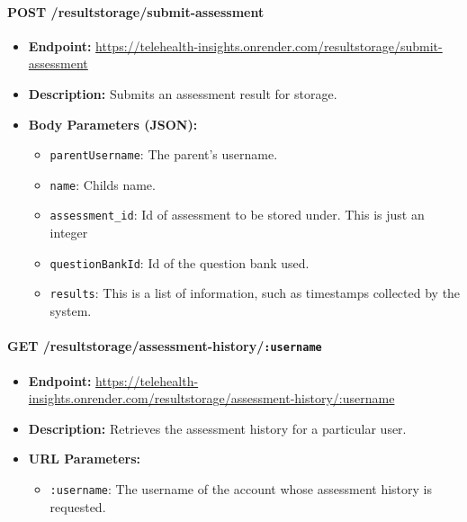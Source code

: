 \documentclass{article}
\begin{document}
  \paragraph{POST /resultstorage/submit-assessment}
  \begin{itemize}
      \item \textbf{Endpoint:} 
          \url{https://telehealth-insights.onrender.com/resultstorage/submit-assessment}
      \item \textbf{Description:} Submits an assessment result for storage.
      \item \textbf{Body Parameters (JSON):}
      \begin{itemize}
          \item \texttt{parentUsername}: The parent’s username.
          \item \texttt{name}: Childs name.
          \item \texttt{assessment\_id}: Id of assessment to be stored under. This is just an integer
          \item \texttt{questionBankId}: Id of the question bank used. 
          \item \texttt{results}: This is a list of information, such as timestamps collected by the system.
      \end{itemize}
  \end{itemize}
  
  \paragraph{GET /resultstorage/assessment-history/\texttt{:username}}
  \begin{itemize}
      \item \textbf{Endpoint:} 
          \url{https://telehealth-insights.onrender.com/resultstorage/assessment-history/:username}
      \item \textbf{Description:} Retrieves the assessment history for a particular user.
      \item \textbf{URL Parameters:}
      \begin{itemize}
          \item \texttt{:username}: The username of the account whose assessment 
                history is requested.
      \end{itemize}
  \end{itemize}
  
\end{document}
